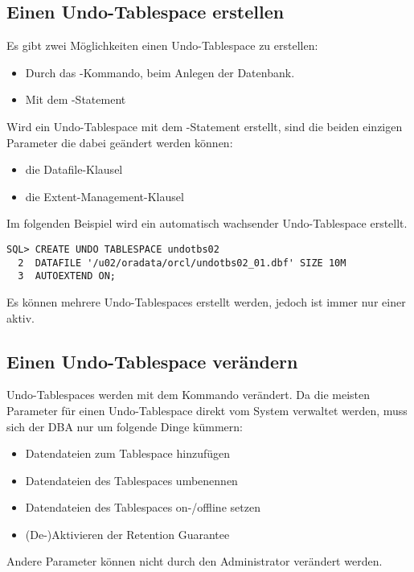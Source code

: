       \subsection{Einen Undo-Tablespace erstellen}
        Es gibt zwei M\"oglichkeiten einen Undo-Tablespace zu erstellen:
        \begin{itemize}
          \item Durch das -Kommando, beim Anlegen der Datenbank.
          \item Mit dem -Statement
        \end{itemize}
        Wird ein Undo-Tablespace mit dem -Statement erstellt, sind die beiden einzigen Parameter die dabei ge\"andert werden k\"onnen:
        \begin{itemize}
          \item die Datafile-Klausel
          \item die Extent-Management-Klausel
        \end{itemize}
        Im folgenden Beispiel wird ein automatisch wachsender Undo-Tablespace erstellt.
        \begin{lstlisting}[caption={Undo-Tablespace erstellen},label=admin503,language=oracle_sql]
SQL> CREATE UNDO TABLESPACE undotbs02
  2  DATAFILE '/u02/oradata/orcl/undotbs02_01.dbf' SIZE 10M
  3  AUTOEXTEND ON;
        \end{lstlisting}
        \begin{merke}
          Es k\"onnen mehrere Undo-Tablespaces erstellt werden, jedoch ist immer
          nur einer aktiv.
        \end{merke}
      \subsection{Einen Undo-Tablespace ver\"andern}
        Undo-Tablespaces werden mit dem Kommando  ver\"andert. Da die meisten Parameter f\"ur einen Undo-Tablespace direkt vom System verwaltet werden, muss sich der DBA nur um folgende Dinge k\"ummern:
        \begin{itemize}
          \item Datendateien zum Tablespace hinzuf\"ugen
          \item Datendateien des Tablespaces umbenennen
          \item Datendateien des Tablespaces on-/offline setzen
          \item (De-)Aktivieren der Retention Guarantee
        \end{itemize}
        Andere Parameter k\"onnen nicht durch den Administrator ver\"andert werden.

